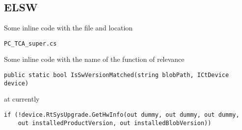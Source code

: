 \subsection{ELSW}

\begin{minipageparskip}
Some inline code with the file and location

\texttt{PC_TCA_super\TSL\PlatformLogic\TarVersionHelper.cs}

Some inline code with the name of the function of relevance

\texttt{public static bool IsSwVersionMatched(string blobPath, ICtDevice device)}

at currently 

\begin{verbatim}
if (!device.RtSysUpgrade.GetHwInfo(out dummy, out dummy, out dummy,
    out installedProductVersion, out installedBlobVersion))
\end{verbatim}
\end{minipageparskip}